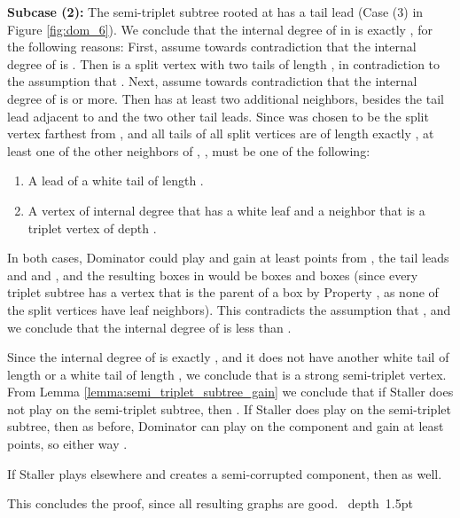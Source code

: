 \documentclass[11pt]{article}
\def\blackslug{\hbox{\hskip 1pt \vrule width 4pt height 8pt
    depth 1.5pt \hskip 1pt}}
\def\QED{\quad\blackslug\lower 8.5pt\null\par}
\def\dnsitem{\vspace{-7pt}\item}
\theoremstyle{definition}
\begin{document}
\smallskip
\par\noindent
{\bf Subcase (2):}
The semi-triplet subtree rooted at  has a  tail lead (Case (3) in Figure \ref{fig:dom_6}).
We conclude that the internal degree of  in  is exactly , for the following reasons:
First, assume towards contradiction that the internal degree of  is . Then  is a split vertex with two tails of length , in contradiction to the assumption that .
Next, assume towards contradiction that the internal degree of  is  or more.
Then  has at least two additional neighbors, besides the tail lead  adjacent to  and the two other tail leads.
Since  was chosen to be the split vertex farthest from , and all tails of all split vertices are of length exactly , at least one of the other neighbors of , , must be one of the following:
\begin{enumerate}
	\dnsitem A lead of a white tail of length . 
	\dnsitem A vertex of internal degree  that has a white leaf and a neighbor  that is a triplet vertex of depth .
\end{enumerate}
In both cases, Dominator could play  and gain at least  points from , the tail leads and  and , 
and the resulting boxes in  would be  boxes and  boxes (since every triplet subtree has a vertex that is the parent of a  box by Property , as none of the split vertices have leaf neighbors).
This contradicts the assumption that , and we conclude that the internal degree of  is less than .

Since the internal degree of  is exactly , and it does not have another white tail of length  
or a white tail of length , 
we conclude that
 is a strong semi-triplet vertex. From Lemma \ref{lemma:semi_triplet_subtree_gain} we conclude that if Staller does not play  on the semi-triplet subtree, then .
If Staller does play on the semi-triplet subtree, then as before, Dominator can play on the  component and gain at least  points, so either way .

\smallskip
\par\noindent
	If Staller plays elsewhere and creates a semi-corrupted component, then  as well.
\bigskip
\par\noindent
This concludes the proof, since all resulting graphs are good.
\QED
\end{document}
